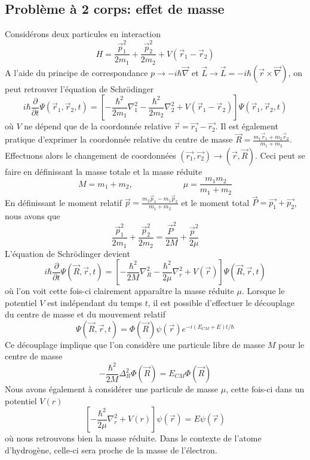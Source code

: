 \subsection{Problème à 2 corps: effet de masse}
Considérons deux particules en interaction
\begin{equation}
H = \frac{\vec p_1^2}{2m_1}+\frac{\vec p_2^2}{2m_2}+V(\vec r_1-\vec r_2)
\end{equation}
A l'aide du principe de correspondance $p\to -i\hbar\vec\nabla$ et $\vec{L}\to \vec{L}=-i\hbar(\vec{r}\times
\vec\nabla)$, on peut retrouver l'équation de Schrödinger
\begin{equation}
i\hbar\frac{\partial}{\partial t}\Psi(\vec{r}_1,\vec{r}_2, t) = \left[-\frac{\hbar^2}{2m_1}\nabla_1^2
-\frac{\hbar^2}{2m_2}\nabla_2^2+V(\vec r_1-\vec r_2)\right]\Psi(\vec{r}_1,\vec{r}_2, t)
\end{equation}
où $V$ ne dépend que de la coordonnée relative $\vec{r} =\vec{r_1}-\vec{r_2}$. Il est également pratique 
d'exprimer la coordonnée relative du centre de masse $\vec{R} = \frac{m_1\vec r_1+m_2\vec r_2}{m_1+m_2}$.
Effectuons alors le changement de coordonnées $(\vec{r_1},\vec{r_2})\to (\vec{r},\vec{R})$. Ceci peut se 
faire en définissant la masse totale et la masse réduite
\begin{equation}
M=m_1+m_2,\qquad\qquad\qquad \mu = \frac{m_1m_2}{m_1+m_2}
\end{equation}
En définissant le moment relatif $\vec{p}=\frac{m_2\vec p_1-m_1\vec p_2}{m_1+m_2}$ et le moment total $\vec{P}
= \vec{p_1}+\vec{p_2}$, nous avons que
\begin{equation}
\frac{\vec p_1^2}{2m_1}+\frac{\vec p_2^2}{2m_2} = \frac{\vec P^2}{2M}+\frac{\vec p^2}{2\mu}
\end{equation}
L'équation de Schrödinger devient
\begin{equation}
i\hbar\frac{\partial}{\partial t}\Psi(\vec R, \vec r, t) = \left[-\frac{\hbar^2}{2M}\nabla_R^2
-\frac{\hbar^2}{2\mu}\nabla_r^2+V(\vec r)\right]\Psi(\vec R, \vec r, t)
\end{equation}
où l'on voit cette fois-ci clairement apparaître la masse réduite $\mu$. Lorsque le potentiel $V$ est 
indépendant du temps $t$, il est possible d'effectuer le découplage du centre de masse et du mouvement 
relatif
\begin{equation}
\Psi(\vec R, \vec r, t) = \Phi(\vec{R})\psi(\vec{r})e^{-i(E_{CM}+E)t/\hbar}
\end{equation}
Ce découplage implique que l'on considère une particule libre de masse $M$ pour le centre de masse
\begin{equation}
-\frac{\hbar^2}{2M}\Delta_R^2\Phi(\vec{R}) = E_{CM}\Phi(\vec{R})
\end{equation}
Nous avons également à considérer une particule de masse $\mu$, cette fois-ci dans un potentiel $V(r)$
\begin{equation}
\left[-\frac{\hbar^2}{2\mu}\nabla_r^2+V(r)\right]\psi(\vec{r}) = E\psi(\vec{r})
\end{equation}
où nous retrouvons bien la masse réduite. Dans le contexte de l'atome d'hydrogène, celle-ci sera proche de la
masse de l'électron. \\

